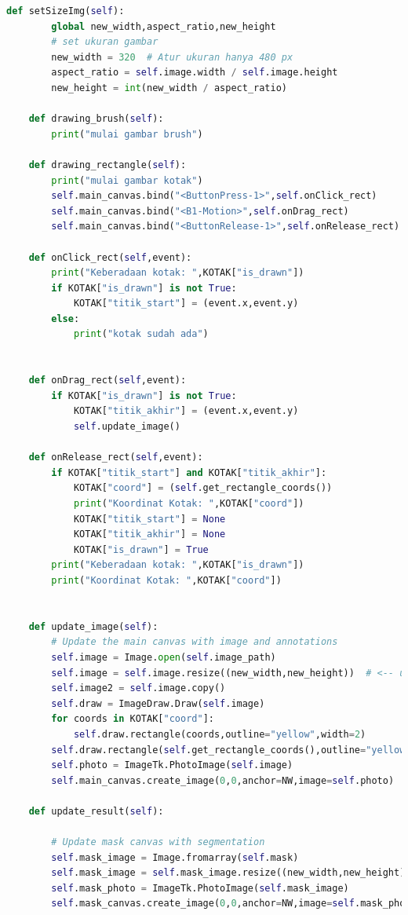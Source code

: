 \begin{lstlisting}[language=Python,basicstyle=\tiny]
    def setSizeImg(self):
        global new_width,aspect_ratio,new_height
        # set ukuran gambar
        new_width = 320  # Atur ukuran hanya 480 px
        aspect_ratio = self.image.width / self.image.height
        new_height = int(new_width / aspect_ratio)

    def drawing_brush(self):
        print("mulai gambar brush")

    def drawing_rectangle(self):
        print("mulai gambar kotak")
        self.main_canvas.bind("<ButtonPress-1>",self.onClick_rect)
        self.main_canvas.bind("<B1-Motion>",self.onDrag_rect)
        self.main_canvas.bind("<ButtonRelease-1>",self.onRelease_rect)

    def onClick_rect(self,event):
        print("Keberadaan kotak: ",KOTAK["is_drawn"])
        if KOTAK["is_drawn"] is not True:
            KOTAK["titik_start"] = (event.x,event.y)
        else:
            print("kotak sudah ada")


    def onDrag_rect(self,event):
        if KOTAK["is_drawn"] is not True:
            KOTAK["titik_akhir"] = (event.x,event.y)
            self.update_image()

    def onRelease_rect(self,event):
        if KOTAK["titik_start"] and KOTAK["titik_akhir"]:
            KOTAK["coord"] = (self.get_rectangle_coords())
            print("Koordinat Kotak: ",KOTAK["coord"])
            KOTAK["titik_start"] = None
            KOTAK["titik_akhir"] = None
            KOTAK["is_drawn"] = True
        print("Keberadaan kotak: ",KOTAK["is_drawn"])
        print("Koordinat Kotak: ",KOTAK["coord"])


    def update_image(self):
        # Update the main canvas with image and annotations
        self.image = Image.open(self.image_path)
        self.image = self.image.resize((new_width,new_height))  # <-- untuk resize ukuran
        self.image2 = self.image.copy()
        self.draw = ImageDraw.Draw(self.image)
        for coords in KOTAK["coord"]:
            self.draw.rectangle(coords,outline="yellow",width=2)
        self.draw.rectangle(self.get_rectangle_coords(),outline="yellow",width=2)
        self.photo = ImageTk.PhotoImage(self.image)
        self.main_canvas.create_image(0,0,anchor=NW,image=self.photo)
    
    def update_result(self):

		# Update mask canvas with segmentation
        self.mask_image = Image.fromarray(self.mask)
        self.mask_image = self.mask_image.resize((new_width,new_height)) # <-- untuk resize ukuran
        self.mask_photo = ImageTk.PhotoImage(self.mask_image)
        self.mask_canvas.create_image(0,0,anchor=NW,image=self.mask_photo)


\end{lstlisting}
